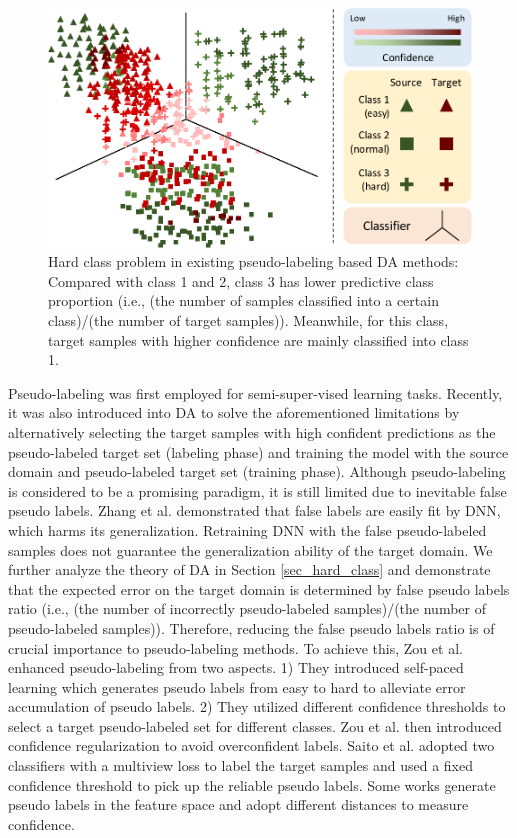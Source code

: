 \documentclass[a4paper,fleqn]{cas-dc}
\begin{document}
	\begin{figure}[!t]
		\centering
		\includegraphics[width=0.85\columnwidth]{figs/hard_class.pdf}
		\caption{Hard class problem in existing pseudo-labeling based DA methods: Compared with class 1 and 2, class 3 has lower predictive class proportion (i.e., (the number of samples classified into a certain class)/(the number of target samples)). Meanwhile, for this class, target samples with higher confidence are mainly classified into class 1.
		}\label{fig1}
	\end{figure}
	
	Pseudo-labeling \cite{lee2013pseudo} was first employed for semi-super-vised learning tasks. Recently, it was also introduced into DA to solve the aforementioned limitations by alternatively selecting the target samples with high confident predictions as the pseudo-labeled target set (labeling phase) and training the model with the source domain and pseudo-labeled target set (training phase). Although pseudo-labeling is considered to be a promising paradigm, it is still limited due to inevitable false pseudo labels. Zhang et al. \cite{zhang2016understanding}  demonstrated that false labels are easily fit by DNN, which harms its generalization. Retraining DNN with the false pseudo-labeled samples does not guarantee the generalization ability of the target domain. We further analyze the theory of DA \cite{DBLP:journals/ml/Ben-DavidBCKPV10} in Section \ref{sec_hard_class} and demonstrate that the expected error on the target domain is determined by false pseudo labels ratio (i.e., (the number of incorrectly pseudo-labeled samples)/(the number of pseudo-labeled samples)). Therefore, reducing the false pseudo labels ratio is of crucial importance to pseudo-labeling methods. {To achieve this}, Zou et al. \cite{zou2018domain} enhanced pseudo-labeling from two aspects. 1) They introduced self-paced learning which generates pseudo labels from easy to hard to alleviate error accumulation of pseudo labels. 2) They utilized different confidence thresholds to select a target pseudo-labeled set for different classes. Zou et al. \cite{zou2019confidence} then introduced confidence regularization to avoid overconfident labels. Saito et al. \cite{saito2017asymmetric} adopted two classifiers with a multiview loss to label the target samples and used a fixed confidence threshold to pick up the reliable pseudo labels. Some works \cite{xie2018learning,chen2019progressive,DBLP:journals/corr/abs-1812-00893,chen2019joint} generate pseudo labels in the feature space and adopt different distances to measure confidence. 
	
\end{document}
